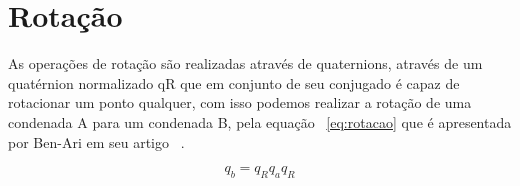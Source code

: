 \section{Rotação}

As operações de rotação são realizadas através de quaternions, através de um quatérnion normalizado qR que em conjunto de seu conjugado é capaz de rotacionar um ponto qualquer,  com isso podemos realizar a rotação de uma condenada A para um condenada B, pela equação ~\ref{eq:rotacao} que é apresentada por Ben-Ari em seu artigo ~\cite[]{Ben-Ari}. 

\begin{equation}
    q_b = q_Rq_aq_R
    \label{eq:rotacao}
\end{equation}
